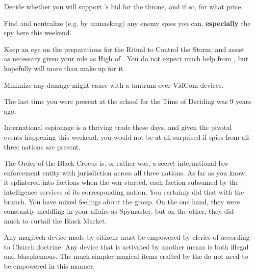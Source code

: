 \documentclass[char]{GL2020}
\begin{document}
\begin{itemz}
    \item Decide whether you will support \cPrince{}’s bid for the throne, and if so, for what price. 
    \item Find and neutralize (e.g. by unmasking) any enemy spies you can, \textbf{especially} the \pShip{} spy here this weekend.
    \item Keep an eye on the preparations for the Ritual to Control the Storm, and assist as necessary given your role as High \cAntiChup{\Cleric} of \cTechGod{}. You do not expect much help from \cBeetle{}, but hopefully \cHedonist{} will more than make up for it.
    \item Minimize any damage \cTechStar{} might cause with a tantrum over \cTechStar{\their} VidCom devices.
\end{itemz}

\begin{itemz}[Notes]
    \item The last time you were present at the school for the Time of Deciding was 9 years ago.
    \item International espionage is a thriving trade these days, and given the pivotal events happening this weekend, you would not be at all surprised if spies from all three nations are present.
    \item The Order of the Black Crocus is, or rather was, a secret international law enforcement entity with jurisdiction across all three nations. As far as you know, it splintered into factions when the war started, each faction subsumed by the intelligence services of its corresponding nation. You certainly did that with the \pTech{} branch. You have mixed feelings about the group. On the one hand, they were constantly meddling in your affairs as Spymaster, but on the other, they did much to curtail the Black Market.
    \item Any magitech device made by \pTech{} citizens must be empowered by clerics of \cTechGod{} according to Church doctrine. Any device that is activated by another means is both illegal and blasphemous. The much simpler magical items crafted by the \pShippies{} do not need to be empowered in this manner.
\end{itemz}
\end{document}
